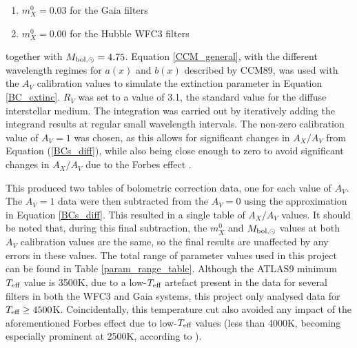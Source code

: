 \documentclass[12pt, a4paper]{report}
\begin{document}
\begin{enumerate}
\item $m_{X}^{0} = 0.03$ for the Gaia filters
\item $m_{X}^{0} = 0.00$ for the Hubble WFC3 filters
\end{enumerate}

together with $M_{\textnormal{bol},\odot} = 4.75$. Equation \ref{CCM_general}, with the different wavelength regimes for $a(x)$ and $b(x)$ described by CCM89, was used with the $A_{V}$ calibration values to simulate the extinction parameter in Equation \ref{BC_extinc}. $R_{V}$ was set to a value of 3.1, the standard value for the diffuse interstellar medium. The integration was carried out by iteratively adding the integrand results at regular small wavelength intervals. The non-zero calibration value of $A_{V} = 1$ was chosen, as this allows for significant changes in $A_{X}/A_{V}$ from Equation (\ref{BCs_diff}), while also being close enough to zero to avoid significant changes in $A_{X}/A_{V}$ due to the Forbes effect \citep{2008PASP..120..583G}.

This produced two tables of bolometric correction data, one for each value of $A_{V}$. The $A_{V} = 1$ data were then subtracted from the $A_{V} = 0$ using the approximation in Equation \ref{BCs_diff}. This resulted in a single table of $A_{X}/A_{V}$ values. It should be noted that, during this final subtraction, the $m_{X}^{0}$ and $M_{\textnormal{bol},\odot}$ values at both $A_{V}$ calibration values are the same, so the final results are unaffected by any errors in these values.
The total range of parameter values used in this project can be found in Table \ref{param_range_table}. Although the ATLAS9 minimum $T_{\textnormal{eff}}$ value is 3500K, due to a low-$T_{\textnormal{eff}}$ artefact present in the data for several filters in both the WFC3 and Gaia systems, this project only analysed data for $T_{\textnormal{eff}} \geq 4500$K. Coincidentally, this temperature cut also avoided any impact of the aforementioned Forbes effect due to low-$T_{\textnormal{eff}}$ values (less than 4000K, becoming especially prominent at 2500K, according to \cite{2008PASP..120..583G}).
\end{document}
